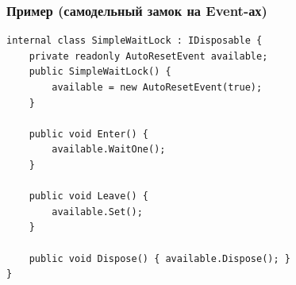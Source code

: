 \documentclass[xetex,mathserif,serif]{beamer}
\begin{document}
	\begin{frame}[fragile]
		\frametitle{Пример (самодельный замок на Event-ах)}
		\begin{small}
			\begin{verbatim}
internal class SimpleWaitLock : IDisposable {
    private readonly AutoResetEvent available;
    public SimpleWaitLock() {
        available = new AutoResetEvent(true); 
    }

    public void Enter() {
        available.WaitOne();
    }

    public void Leave() {
        available.Set();
    }

    public void Dispose() { available.Dispose(); }
}
			\end{verbatim}
		\end{small}
	\end{frame}
\end{document}
